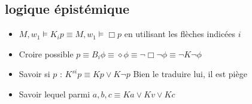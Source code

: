 \documentclass{article}
\theoremstyle{plain}%
\theoremstyle{definition}
\theoremstyle{remark}
\begin{document}
\subsection{logique épistémique}
\begin{itemize}
    \item $ M, w_1 \models K_i p \equiv M, w_1 \models \Box p $ en utilisant les flèches indicées $ i $
    \item Croire possible $ p \equiv B_i \phi \equiv \diamond \phi \equiv \neg \Box \neg \phi \equiv \neg K \neg \phi  $ 
    \item Savoir si $ p $ : $ K^{si} p \equiv K p \vee K \neg p $ Bien le traduire lui, il est piège
    \item Savoir lequel parmi $ a,b,c \equiv K a \vee K v \vee K c $ 
\end{itemize}
\end{document}
